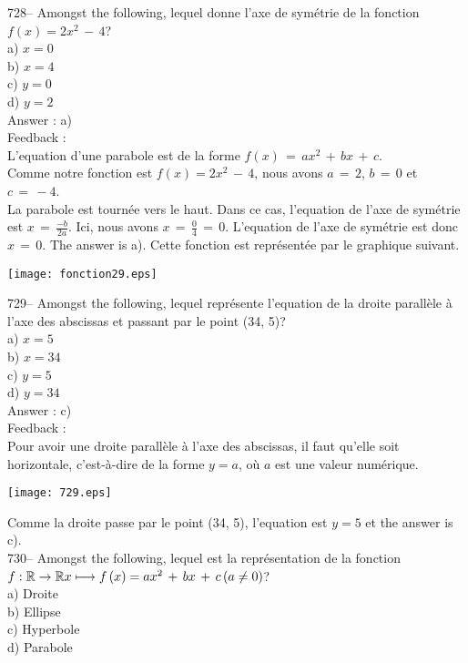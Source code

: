 \documentclass[letterpaper, 12pt]{article}
\begin{document}
728-- Amongst the following, lequel donne l'axe de sym\'etrie de
la fonction $f(x)= 2x^{2}\,-\,4$?\\
a) $x=0$\\
b) $x=4$\\
c) $y=0$\\
d) $y=2$\\

Answer : a)\\

Feedback : \\
L'equation d'une parabole est de la forme
$f(x)\,=\,ax^2\,+\,bx\,+\,c$.\\
Comme notre fonction est $f(x)= 2x^{2}\,-\,4$, nous avons $a\,=\,2$,
$b\,=\,0$ et $c\,=\,-4$.\\
La parabole est tourn\'ee vers le haut. Dans ce cas, l'equation de
l'axe de sym\'etrie est $x\,=\, \frac{-b}{2a}$. Ici, nous avons
$x\,=\,\frac{0}{4}\,=\,0$. L'equation de l'axe de sym\'etrie est
donc $x\,=\,0$. The answer is a).
Cette fonction est repr\'esent\'ee par le graphique suivant.\\
    \begin{center}
    \texttt{[image: fonction29.eps]}
    \end{center}


729-- Amongst the following, lequel repr\'esente l'equation de
la droite parall\`ele \`a l'axe des abscissas et passant par le point (34,
5)?\\
a) $x=5$\\
b) $x=34$\\
c) $y=5$\\
d) $y=34$\\

Answer : c)\\

Feedback : \\
Pour avoir une droite parall\`ele \`a l'axe des abscissas, il faut
qu'elle soit horizontale, c'est-\`a-dire de la forme $y=a$, o\`u $a$
est une valeur num\'erique.   \begin{center}
    \texttt{[image: 729.eps]}
    \end{center}
     Comme la droite passe par le point (34, 5), l'equation est
$y=5$ et the answer is c).\\


730-- Amongst the following, lequel est la repr\'esentation de la
fonction \\
$f :\mathbb{R}\rightarrow\mathbb{R}\\
x\longmapsto f\left( x\right) =ax^{2}\,+\,bx\,+\,c \left( a\neq 0
\right)$?\\
a) Droite\\
b) Ellipse \\
c) Hyperbole\\
d) Parabole \\
\end{document}
